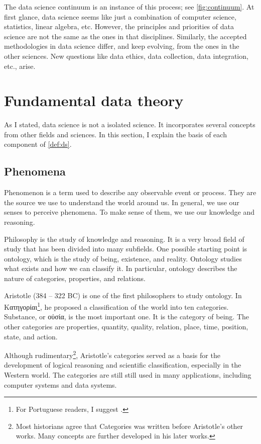The data science continuum is an instance of this process; see \cref{fig:continuum}.  At
first glance, data science seems like just a combination of computer science, statistics,
linear algebra, etc. However, the principles and priorities of data science are not the
same as the ones in that disciplines.  Similarly, the accepted methodologies in data
science differ, and keep evolving, from the ones in the other sciences.  New questions
like data ethics, data collection, data integration, etc., arise.


\section{Fundamental data theory}

As I stated, data science is not a isolated science.  It incorporates several concepts
from other fields and sciences.  In this section, I explain the basis of each component of
\cref{def:ds}.

\subsection{Phenomena}

Phenomenon is a term used to describe any observable event or process.  They are the
source we use to understand the world around us.  In general, we use our senses to
perceive phenomena.  To make sense of them, we use our knowledge and reasoning.

Philosophy is the study of knowledge and reasoning.  It is a very broad field of study
that has been divided into many subfields.  One possible starting point is \gls{ontology},
which is the study of being, existence, and reality.  Ontology studies what exists and how
we can classify it.  In particular, ontology describes the nature of categories,
properties, and relations.

Aristotle (384 -- 322 BC) is one of the first philosophers to study ontology. In
Κατηγορίαι\footnote{For Portuguese readers, I suggest .}, he
proposed a classification of the world into ten categories. Substance, or οὐσία,
is the most important one.  It is the category of being.  The other categories
are properties, quantity, quality, relation, place, time, position, state, and action.

Although rudimentary\footnote{Most historians agree that Categories was written before
Aristotle's other works.  Many concepts are further developed in his later works.},
Aristotle's categories served as a basis for the development of logical reasoning and
scientific classification, especially in the Western world.  The categories are still
still used in many applications, including computer systems and data systems.

